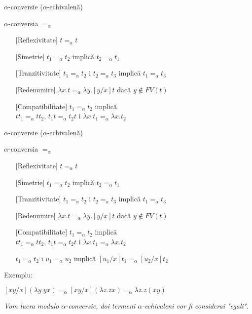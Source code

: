 \documentclass[xcolor=pdftex,romanian,colorlinks]{beamer}
\begin{document}
\begin{frame}[fragile]{$\alpha$-conversie ($\alpha$-echivalen\ts \u a)}
\begin{block}{$\alpha$-conversia $=_\alpha$ }
\begin{itemize}
\item[][Reflexivitate] $t=_\alpha t$
\item[][Simetrie]   $t_1=_\alpha t_2$ implic\u a $t_2=_\alpha t_1$
\item[][Tranzitivitate] $t_1=_\alpha t_2$ \sh i $t_2=_\alpha t_3$ implic\u a $t_1=_\alpha t_3$
\item[][Redenumire] $\lambda x.t =_\alpha \lambda y. [y/x]t$ dac\u a $y\not\in FV(t)$
\item[][Compatibilitate]  $t_1=_\alpha t_2$ implic\u a \\
 \hspace*{3cm} $tt_1=_\alpha tt_2$, $t_1t=_\alpha t_2t$ \sh i 
$\lambda x.t_1=_\alpha\lambda x.t_2$ 
\end{itemize}
\end{block}


\end{frame}


\begin{frame}[fragile]{$\alpha$-conversie ($\alpha$-echivalen\ts \u a)}
\begin{block}{$\alpha$-conversia $=_\alpha$ }
\begin{itemize}
\item[][Reflexivitate] $t=_\alpha t$
\item[][Simetrie]   $t_1=_\alpha t_2$ implic\u a $t_2=_\alpha t_1$
\item[][Tranzitivitate] $t_1=_\alpha t_2$ \sh i $t_2=_\alpha t_3$ implic\u a $t_1=_\alpha t_3$
\item[][Redenumire] $\lambda x.t =_\alpha \lambda y. [y/x]t$ dac\u a $y\not\in FV(t)$
\item[][Compatibilitate]  $t_1=_\alpha t_2$ implic\u a \\
 \hspace*{3cm} $tt_1=_\alpha tt_2$, $t_1t=_\alpha t_2t$ \sh i 
$\lambda x.t_1=_\alpha\lambda x.t_2$ 

 \hspace*{2cm} $t_1=_\alpha t_2$ \sh i $u_1=_\alpha u_2$ implic\u a 
$[u_1/x]t_1=_\alpha [u_2/x] t_2$
\end{itemize}
\end{block}

Exemplu:

$[xy/x](\lambda y. yx)=_\alpha [xy/x](\lambda z. zx)=_\alpha \lambda z. z(xy) $
\pause\medskip

{\it Vom lucra modulo $\alpha$-conversie, doi termeni $\alpha$-echivalen\ts i vor fi considera\ts i "egali".}
\end{frame}
\end{document}
